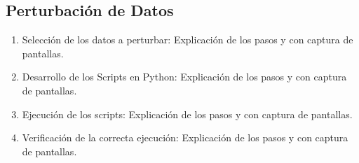 \documentclass[a4paper,openright,12pt]{book}
\theoremstyle{definition}
\theoremstyle{remark}
\begin{document}
    \subsection{Perturbación de Datos}

\begin{enumerate}
	\item Selección de los datos a perturbar: Explicación de los pasos y con captura de pantallas.
    \item Desarrollo de los Scripts en Python: Explicación de los pasos y con captura de pantallas.
    \item Ejecución de los scripts: Explicación de los pasos y con captura de pantallas.
    \item Verificación de la correcta ejecución: Explicación de los pasos y con captura de pantallas.
\end{enumerate}
\end{document}
